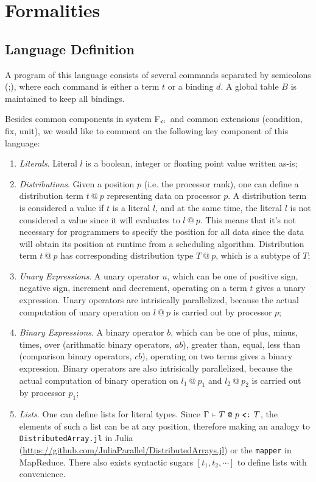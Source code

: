 \documentclass{report}
\makeatletter
\newcommand{\at}{~\texttt{@}~}
\newcommand{\subty}{\texttt{{\raisebox{-.7pt}{<}:}}}
\newcommand{\subtype}{~\texttt{\raisebox{-.7pt}{<}:}~}
\newcommand{\ctx}{~\mathsmaller\vdash~}
\newcommand{\ctxsubtype}[2]{\Gamma\ctx #1 \subtype #2}
\makeatother
\begin{document}
\chapter{Formalities}

\section{Language Definition}

A program of this language consists of several commands separated by semicolons (;), where each command is either a term $t$ or a binding $d$. A global table $B$ is maintained to keep all bindings.

Besides common components in system F$_\subty$ and common extensions (condition, fix, unit), we would like to comment on the following key component of this language:

\begin{enumerate}
  \item \emph{Literals}. Literal $l$ is a boolean, integer or floating point value written as-is;
  \item \emph{Distributions}. Given a position $p$ (i.e. the processor rank), one can define a distribution term $t\at p$ representing data on processor $p$. A distribution term is considered a value if $t$ is a literal $l$, and at the same time, the literal $l$ is not considered a value since it will evaluates to $l\at p$. This means that it's not necessary for programmers to specify the position for all data since the data will obtain its position at runtime from a scheduling algorithm. Distribution term $t\at p$ has corresponding distribution type $T\at p$, which is a subtype of $T$;
  \item \emph{Unary Expressions}. A unary operator $u$, which can be one of positive sign, negative sign, increment and decrement, operating on a term $t$ gives a unary expression. Unary operators are intrisically parallelized, because the actual computation of unary operation on $l\at p$ is carried out by processor $p$;
  \item \emph{Binary Expressions}. A binary operator $b$, which can be one of plus, minus, times, over (arithmatic binary operators, $ab$), greater than, equal, less than (comparison binary operators, $cb$), operating on two terms gives a binary expression. Binary operators are also intrisically parallelized, because the actual computation of binary operation on $l_1\at p_1$ and $l_2\at p_2$ is carried out by processor $p_1$;
  \item \emph{Lists}. One can define lists for literal types. Since $\ctxsubtype{T\at p}{T}$, the elements of such a list can be at any position, therefore making an analogy to \verb|DistributedArray.jl| in Julia (\url{https://github.com/JuliaParallel/DistributedArrays.jl}) or the \verb|mapper| in MapReduce\cite{mapreduce}. There also exists syntactic sugars $[t_1, t_2, \cdots]$ to define lists with convenience.
\end{enumerate}
\end{document}
